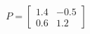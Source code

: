 \documentclass[preview]{standalone}
\begin{document}
\begin{align*}
P=\begin{bmatrix}1.4&-0.5\\0.6&1.2\end{bmatrix}
\end{align*}
\end{document}
